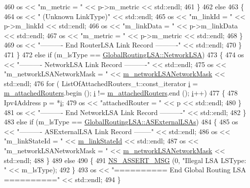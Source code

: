 \begin{DoxyCode}
460               os << \textcolor{stringliteral}{"m\_metric = "} << p->m\_metric << std::endl;
461             \}
462           \textcolor{keywordflow}{else}
463             \{
464               os << \textcolor{stringliteral}{" (Unknown LinkType)"} << std::endl;
465               os << \textcolor{stringliteral}{"m\_linkId = "} << p->m\_linkId << std::endl;
466               os << \textcolor{stringliteral}{"m\_linkData = "} << p->m\_linkData << std::endl;
467               os << \textcolor{stringliteral}{"m\_metric = "} << p->m\_metric << std::endl;
468             \}
469           os << \textcolor{stringliteral}{"---------- End RouterLSA Link Record ----------"} << std::endl;
470         \}
471     \}
472   \textcolor{keywordflow}{else} \textcolor{keywordflow}{if} (m\_lsType == \hyperlink{classns3_1_1GlobalRoutingLSA_a34eb53a1ed37c877923b74d671224fdeab37398976cdc8ddd08e1428a4700b5b4}{GlobalRoutingLSA::NetworkLSA}) 
473     \{
474       os << \textcolor{stringliteral}{"---------- NetworkLSA Link Record ----------"} << std::endl;
475       os << \textcolor{stringliteral}{"m\_networkLSANetworkMask = "} << \hyperlink{classns3_1_1GlobalRoutingLSA_ad5a4590c0997ed0e67f4d46ad0b2decf}{m\_networkLSANetworkMask} << std::endl;
476       \textcolor{keywordflow}{for} ( ListOfAttachedRouters\_t::const\_iterator \hyperlink{bernuolliDistribution_8m_a6f6ccfcf58b31cb6412107d9d5281426}{i} = \hyperlink{classns3_1_1GlobalRoutingLSA_aa7b5e6e43ade3f813a12c47e4420b3eb}{m\_attachedRouters}.begin (); 
      \hyperlink{bernuolliDistribution_8m_a6f6ccfcf58b31cb6412107d9d5281426}{i} != \hyperlink{classns3_1_1GlobalRoutingLSA_aa7b5e6e43ade3f813a12c47e4420b3eb}{m\_attachedRouters}.end (); \hyperlink{bernuolliDistribution_8m_a6f6ccfcf58b31cb6412107d9d5281426}{i}++)
477         \{
478           Ipv4Address p = *\hyperlink{bernuolliDistribution_8m_a6f6ccfcf58b31cb6412107d9d5281426}{i};
479           os << \textcolor{stringliteral}{"attachedRouter = "} << p << std::endl;
480         \}
481       os << \textcolor{stringliteral}{"---------- End NetworkLSA Link Record ----------"} << std::endl;
482     \}
483   \textcolor{keywordflow}{else} \textcolor{keywordflow}{if} (m\_lsType == \hyperlink{classns3_1_1GlobalRoutingLSA_a34eb53a1ed37c877923b74d671224fdea695b98ad474baaa5f11ff5bb06048ec7}{GlobalRoutingLSA::ASExternalLSAs})
484     \{
485       os << \textcolor{stringliteral}{"---------- ASExternalLSA Link Record --------"} << std::endl;
486       os << \textcolor{stringliteral}{"m\_linkStateId = "} << \hyperlink{classns3_1_1GlobalRoutingLSA_a39580ef7a79397ef08b0480e1a606e7a}{m\_linkStateId} << std::endl;
487       os << \textcolor{stringliteral}{"m\_networkLSANetworkMask = "} << \hyperlink{classns3_1_1GlobalRoutingLSA_ad5a4590c0997ed0e67f4d46ad0b2decf}{m\_networkLSANetworkMask} << std::endl;
488     \}
489   \textcolor{keywordflow}{else} 
490     \{
491       \hyperlink{assert_8h_aff5ece9066c74e681e74999856f08539}{NS\_ASSERT\_MSG} (0, \textcolor{stringliteral}{"Illegal LSA LSType: "} << m\_lsType);
492     \}
493   os << \textcolor{stringliteral}{"========== End Global Routing LSA =========="} << std::endl;
494 \}
\end{DoxyCode}


